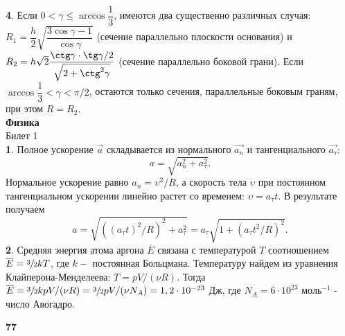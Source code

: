\begin{multicols}{2}
\textbf{4}. Если $0<\gamma\leq\arccos\dfrac{1}{3}$, имеются два существенно различных случая: $R_{1}=\dfrac{h}{2}\sqrt{\dfrac{3\cos\gamma-1}{\cos\gamma}}$ (сечение параллельно плоскости основания) и $R_{2}=h\sqrt{2}\dfrac{\ctg\gamma\cdot\tg\gamma/2 }{\sqrt{2+\ctg^{2}\gamma}}$ (сечение параллельно боковой грани). Если $\arccos\dfrac{1}{3}<\gamma<\pi/2$, остаются только сечения, параллельные боковым граням, при этом $R=R_{2}$.\\
\textbf{Физика}\\
Билет 1\\
\textbf{1}. Полное ускорение $\vec{a}$ складывается из нормального $\vec{a_{n}}$ и тангенциального $\vec{a_{\tau}}$:
\vspace{-0.1cm}
$$a=\sqrt{a_{n}^{2}+a_{\tau}^{2}}.$$
Нормальное ускорение равно $a_{n}=\upsilon^{2}/R$, а скорость тела $\upsilon$ при постоянном тангенциальном ускорении линейно растет со временем: $\upsilon=a_{\tau}t.$ В результате получаем \vspace{-0.35cm}
$$a=\sqrt{((a_{\tau}t)^{2}/R)^{2}+a_{\tau}^{2}}=a_{\tau}\sqrt{1+(a_{\tau}t^{2}/R)^{2}}.$$
\textbf{2}. Средняя энергия атома аргона $\overline{E}$ связана с температурой $T$ соотношением $\overline{E}=\sfrac{3}{2}kT$, где $k -$ постоянная Больцмана. Температуру найдем из уравнения Клайперона-Менделеева: $T=pV/(\nu R)$. Тогда $\overline{E}=\sfrac{3}{2}kpV/(\nu R)=\sfrac{3}{2}pV/(\nu N_{A}) = 1,2 \cdot 10^{-23}$ Дж, где $N_{A} = 6 \cdot 10^23$ моль$^{-1}$ - число Авогадро.
\begin{flushright}
	\Huge{\textbf{77}}
\end{flushright}
\end{multicols}
\newpage
